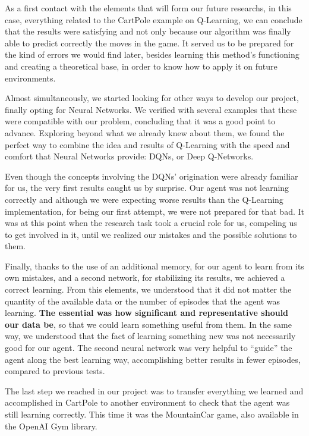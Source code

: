 As a first contact with the elements that will form our future researchs, in this case, everything related to the CartPole example on Q-Learning, we can conclude that the results were satisfying and not only because our algorithm was finally able to predict correctly the moves in the game. It served us to be prepared for the kind of errors we would find later, besides learning this method's functioning and creating a theoretical base, in order to know how to apply it on future environments.

Almost simultaneously, we started looking for other ways to develop our project, finally opting for Neural Networks. We verified with several examples that these were compatible with our problem, concluding that it was a good point to advance. Exploring beyond what we already knew about them, we found the perfect way to combine the idea and results of Q-Learning with the speed and comfort that Neural Networks provide: DQNs, or Deep Q-Networks.

Even though the concepts involving the DQNs' origination were already familiar for us, the very first results caught us by surprise. Our agent was not learning correctly and although we were expecting worse results than the Q-Learning implementation, for being our first attempt, we were not prepared for that bad. It was at this point when the research task took a crucial role for us, compeling us to get involved in it, until we realized our mistakes and the possible solutions to them.

Finally, thanks to the use of an additional memory, for our agent to learn from its own mistakes, and a second network, for stabilizing its results, we achieved a correct learning. From this elements, we understood that it did not matter the quantity of the available data or the number of episodes that the agent was learning. \textbf{The essential was how significant and representative should our data be}, so that we could learn something useful from them. In the same way, we understood that the fact of learning something new was not necessarily good for our agent. The second neural network was very helpful to ``guide'' the agent along the best learning way, accomplishing better results in fewer episodes, compared to previous tests.

The last step we reached in our project was to transfer everything we learned and accomplished in CartPole to another environment to check that the agent was still learning correctly. This time it was the MountainCar game, also available in the OpenAI Gym library. 

